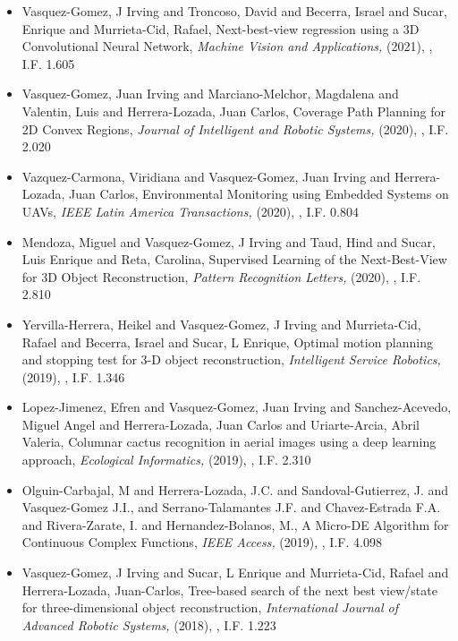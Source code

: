 \begin{itemize}
\item Vasquez-Gomez, J Irving and Troncoso, David and Becerra, Israel and Sucar, Enrique and Murrieta-Cid, Rafael, Next-best-view regression using a 3D Convolutional Neural Network,\textit{ Machine Vision and Applications,} (2021), \href{https://doi.org/10.1007/s00138-020-01166-2} {\faFilePdfO}, I.F. 1.605 
\item Vasquez-Gomez, Juan Irving and Marciano-Melchor, Magdalena and Valentin, Luis and Herrera-Lozada, Juan Carlos, Coverage Path Planning for 2D Convex Regions,\textit{ Journal of Intelligent and Robotic Systems,} (2020), \href{https://doi.org/10.1007/s10846-019-01024-y} {\faFilePdfO}, I.F. 2.020 
\item Vazquez-Carmona, Viridiana and Vasquez-Gomez, Juan Irving and Herrera-Lozada, Juan Carlos, Environmental Monitoring using Embedded Systems on UAVs,\textit{ IEEE Latin America Transactions,} (2020), \href{https://doi.org/10.1109/TLA.2020.9085284} {\faFilePdfO}, I.F. 0.804 
\item Mendoza, Miguel and Vasquez-Gomez, J Irving and Taud, Hind and Sucar, Luis Enrique and Reta, Carolina, Supervised Learning of the Next-Best-View for 3D Object Reconstruction,\textit{ Pattern Recognition Letters,} (2020), \href{https://doi.org/10.1016/j.patrec.2020.02.024} {\faFilePdfO}, I.F. 2.810 
\item Yervilla-Herrera, Heikel and Vasquez-Gomez, J Irving and Murrieta-Cid, Rafael and Becerra, Israel and Sucar, L Enrique, Optimal motion planning and stopping test for 3-D object reconstruction,\textit{ Intelligent Service Robotics,} (2019), \href{https://doi.org/10.1007/s11370-018-0264-y} {\faFilePdfO}, I.F. 1.346 
\item Lopez-Jimenez, Efren and Vasquez-Gomez, Juan Irving and Sanchez-Acevedo, Miguel Angel and Herrera-Lozada, Juan Carlos and Uriarte-Arcia, Abril Valeria, Columnar cactus recognition in aerial images using a deep learning approach,\textit{ Ecological Informatics,} (2019), \href{https://doi.org/10.1016/j.ecoinf.2019.05.005} {\faFilePdfO}, I.F. 2.310 
\item Olguin-Carbajal, M and Herrera-Lozada, J.C. and Sandoval-Gutierrez, J. and Vasquez-Gomez J.I., and Serrano-Talamantes J.F. and Chavez-Estrada F.A. and Rivera-Zarate, I. and Hernandez-Bolanos, M., A Micro-DE Algorithm for Continuous Complex Functions,\textit{ IEEE Access,} (2019), \href{https://doi.org/10.1109/ACCESS.2019.2954296} {\faFilePdfO}, I.F. 4.098 
\item Vasquez-Gomez, J Irving and Sucar, L Enrique and Murrieta-Cid, Rafael and Herrera-Lozada, Juan-Carlos, Tree-based search of the next best view/state for three-dimensional object reconstruction,\textit{ International Journal of Advanced Robotic Systems,} (2018), \href{https://doi.org/10.1177/1729881418754575} {\faFilePdfO}, I.F. 1.223 

\end{itemize}
